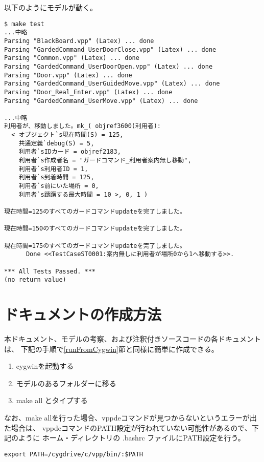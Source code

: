 \documentclass[a4paper,8pt]{jsarticle}
\begin{document}
以下のようにモデルが動く。

\begin{verbatim}
$ make test
...中略
Parsing "BlackBoard.vpp" (Latex) ... done
Parsing "GardedCommand_UserDoorClose.vpp" (Latex) ... done
Parsing "Common.vpp" (Latex) ... done
Parsing "GardedCommand_UserDoorOpen.vpp" (Latex) ... done
Parsing "Door.vpp" (Latex) ... done
Parsing "GardedCommand_UserGuidedMove.vpp" (Latex) ... done
Parsing "Door_Real_Enter.vpp" (Latex) ... done
Parsing "GardedCommand_UserMove.vpp" (Latex) ... done

...中略
利用者が、移動しました。mk_( objref3600(利用者):
  < オブジェクト`s現在時間(S) = 125,
    共通定義`debug(S) = 5,
    利用者`sIDカード = objref2183,
    利用者`s作成者名 = "ガードコマンド_利用者案内無し移動",
    利用者`s利用者ID = 1,
    利用者`s到着時間 = 125,
    利用者`s前にいた場所 = 0,
    利用者`s躊躇する最大時間 = 10 >, 0, 1 )

現在時間=125のすべてのガードコマンドupdateを完了しました。

現在時間=150のすべてのガードコマンドupdateを完了しました。

現在時間=175のすべてのガードコマンドupdateを完了しました。
      Done <<TestCaseST0001:案内無しに利用者が場所0から1へ移動する>>.
 
*** All Tests Passed. ***
(no return value)
\end{verbatim}

\section {ドキュメントの作成方法}
\label{makeDoc}
本ドキュメント、モデルの考察、および注釈付きソースコードの各ドキュメントは、
下記の手順で\ref{runFromCygwin}節と同様に簡単に作成できる。

\begin{enumerate}
	\item cygwinを起動する
	\item モデルのあるフォルダーに移る
	\item make all とタイプする
\end{enumerate}

なお、make allを行った場合、vppdeコマンドが見つからないというエラーが出た場合は、
vppdeコマンドのPATH設定が行われていない可能性があるので、下記のように
ホーム・ディレクトリの .bashrc ファイルにPATH設定を行う。

\begin{verbatim}
export PATH=/cygdrive/c/vpp/bin/:$PATH
\end{verbatim}
\end{document}
